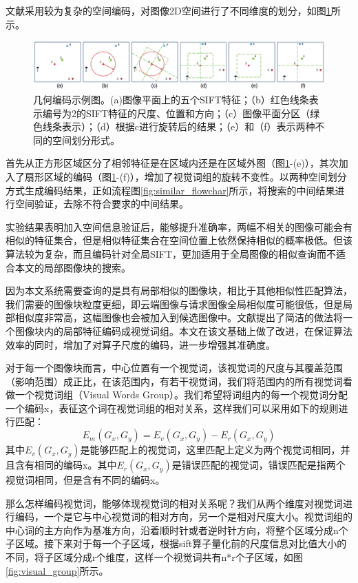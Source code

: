 文献\cite{Zhou:2013jz}采用较为复杂的空间编码，对图像2D空间进行了不同维度的划分，如图\ref{fig:geo_coding}所示。
\begin{figure}
\centering\includegraphics[width=15cm]{imgs/ch3/geo_coding}
\caption{几何编码示例图。(a)图像平面上的五个SIFT特征；（b）红色线条表示编号为2的SIFT特征的尺度、位置和方向；（c）图像平面分区（绿色线条表示）；（d）根据c进行旋转后的结果；（e）和（f）表示两种不同的空间划分形式。}
\label{fig:geo_coding}
\end{figure}
首先从正方形区域区分了相邻特征是在区域内还是在区域外图（图\ref{fig:geo_coding}-(e)），其次加入了扇形区域的编码（图\ref{fig:geo_coding}-(f)），增加了视觉词组的旋转不变性。以两种空间划分方式生成编码结果，正如流程图\ref{fig:similar_flowchar}所示，将搜索的中间结果进行空间验证，去除不符合要求的中间结果。

实验结果表明加入空间信息验证后，能够提升准确率，两幅不相关的图像可能会有相似的特征集合，但是相似特征集合在空间位置上依然保持相似的概率极低。但该算法较为复杂，而且编码针对全局SIFT，更加适用于全局图像的相似查询而不适合本文的局部图像块的搜索。

因为本文系统需要查询的是具有局部相似的图像块，相比于其他相似性匹配算法，我们需要的图像块粒度更细，即云端图像与请求图像全局相似度可能很低，但是局部相似度非常高，这幅图像也会被加入到候选图像中。文献\cite{Dai:2012vn}提出了简洁的做法将一个图像块内的局部特征编码成视觉词组。本文在该文基础上做了改进，在保证算法效率的同时，增加了对算子尺度的编码，进一步增强其准确度。

对于每一个图像块而言，中心位置有一个视觉词，该视觉词的尺度与其覆盖范围（影响范围）成正比，在该范围内，有若干视觉词，我们将范围内的所有视觉词看做一个视觉词组（Visual Words Group）。我们希望将词组内的每一个视觉词分配一个编码x，表征这个词在视觉词组的相对关系，这样我们可以采用如下的规则进行匹配：
\begin{equation}
E_m(G_x,G_y) = E_v(G_x,G_y) - E_r(G_x,G_y)
\end{equation}
其中\(E_v(G_x,G_y)\)是能够匹配上的视觉词，这里匹配上定义为两个视觉词相同，并且含有相同的编码x。其中\(E_r(G_x,G_y)\)是错误匹配的视觉词，错误匹配是指两个视觉词相同，但是含有不同的编码x。

那么怎样编码视觉词，能够体现视觉词的相对关系呢？我们从两个维度对视觉词进行编码，一个是它与中心视觉词的相对方向，另一个是相对尺度大小。视觉词组的中心词的主方向作为基准方向，沿着顺时针或者逆时针方向，将整个区域分成n个子区域。接下来对于每一个子区域，根据sift算子量化前的尺度信息对比值大小的不同，将子区域分成r个维度，这样一个视觉词共有n*r个子区域，如图\ref{fig:visual_group}所示。


